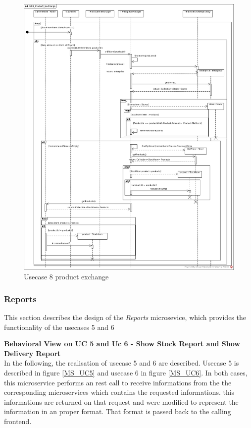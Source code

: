 			\begin{figure}[!h]
				\centering
				\includegraphics[width = 1\textwidth]{img/UC8_Product_Exchange.jpg}
				\caption{Usecase 8 product exchange}
				\label{MS_UC8}
			\end{figure}
		\FloatBarrier	
		
		\subsubsection{Reports}
		This section describes the design of the \textit{Reports} microsevice, which provides the functionality of the usecases 5 and 6
		
		\textbf{Behavioral View on UC 5 and Uc 6 - Show Stock Report and Show Delivery Report} \\
		In the following, the realisation of usecase 5 and 6 are described. Usecase 5 is described in figure \ref{MS_UC5} and usecase 6 in figure \ref{MS_UC6}. 
		In both cases, this microservice performs an rest call to receive informations from the the corresponding microservices which contains the requested informations. this informations are returned on that request and were modified to represent the information in an proper format. That format is passed back to the calling frontend.
			
